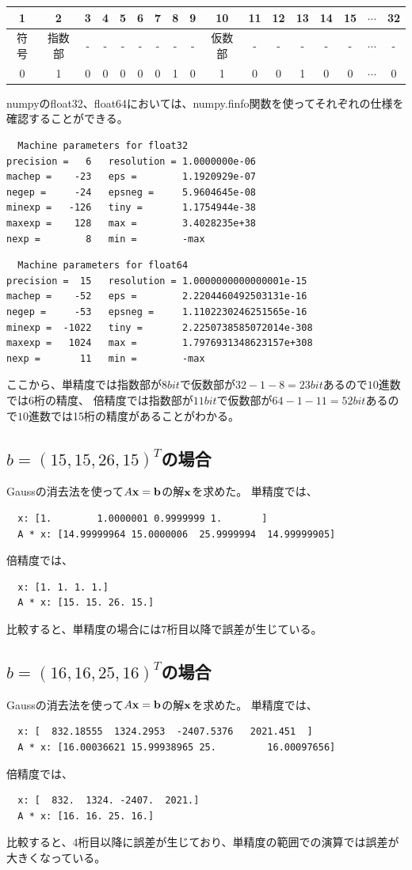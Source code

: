 \documentclass{jsarticle}
\newcommand{\bx}{\bold{x}}
\newcommand{\bb}{\bold{b}}
\begin{document}
\begin{tabular}{|c|c|c|c|c|c|c|c|c|c|c|c|c|c|c|c|c|}\hline
1&2&3&4&5&6&7&8&9&10&11&12&13&14&15&$\cdots$&32\\\hline
符号 & 指数部&-&-&-&-&-&-&-&仮数部&-&-&-&-&-&$\cdots$&-\\\hline
0&1&0&0&0&0&0&1&0&1&0&0&1&0&0&$\cdots$&0\\\hline
\end{tabular}



numpyのfloat32、float64においては、numpy.finfo関数を使ってそれぞれの仕様を確認することができる。

\begin{lstlisting}
  Machine parameters for float32
precision =   6   resolution = 1.0000000e-06
machep =    -23   eps =        1.1920929e-07
negep =     -24   epsneg =     5.9604645e-08
minexp =   -126   tiny =       1.1754944e-38
maxexp =    128   max =        3.4028235e+38
nexp =        8   min =        -max
\end{lstlisting}
\begin{lstlisting}
  Machine parameters for float64
precision =  15   resolution = 1.0000000000000001e-15
machep =    -52   eps =        2.2204460492503131e-16
negep =     -53   epsneg =     1.1102230246251565e-16
minexp =  -1022   tiny =       2.2250738585072014e-308
maxexp =   1024   max =        1.7976931348623157e+308
nexp =       11   min =        -max
\end{lstlisting}

ここから、単精度では指数部が$8bit$で仮数部が$32-1-8=23bit$あるので$10$進数では6桁の精度、
倍精度では指数部が$11bit$で仮数部が$64-1-11=52bit$あるので$10$進数では15桁の精度があることがわかる。
\subsection{$b=(15, 15, 26, 15)^T$の場合}
Gaussの消去法を使って$A\bx = \bb$の解$\bx$を求めた。
単精度では、
\begin{lstlisting}
  x: [1.        1.0000001 0.9999999 1.       ]
  A * x: [14.99999964 15.0000006  25.9999994  14.99999905]
\end{lstlisting}
倍精度では、
\begin{lstlisting}
  x: [1. 1. 1. 1.]
  A * x: [15. 15. 26. 15.]
\end{lstlisting}
比較すると、単精度の場合には$7$桁目以降で誤差が生じている。

\subsection{$b=(16, 16, 25, 16)^T$の場合}
Gaussの消去法を使って$A\bx = \bb$の解$\bx$を求めた。
単精度では、
\begin{lstlisting}
  x: [  832.18555  1324.2953  -2407.5376   2021.451  ]
  A * x: [16.00036621 15.99938965 25.         16.00097656]
\end{lstlisting}
倍精度では、
\begin{lstlisting}
  x: [  832.  1324. -2407.  2021.]
  A * x: [16. 16. 25. 16.]
\end{lstlisting}
比較すると、$4$桁目以降に誤差が生じており、単精度の範囲での演算では誤差が大きくなっている。
\end{document}
